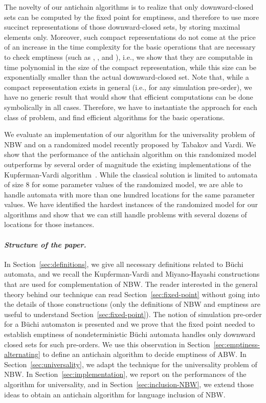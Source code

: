 \documentclass{LMCS}
\begin{document}
The novelty of our antichain algorithms is to realize that only downward-closed
sets can be computed by the fixed point for emptiness, and therefore to use more 
succinct representations of those downward-closed sets, by storing maximal elements only. 
Moreover, such compact representations do not come at the price of an increase 
in the time complexity for the basic operations that are necessary to check emptiness
(such as , , and ), i.e., we show that they are computable in time
polynomial in the size of the compact representation, while this size can be exponentially
smaller than the actual downward-closed set.
Note that, while a compact representation exists in general (i.e., for any
simulation pre-order), we have no generic result that would show that efficient
computations can be done symbolically in all cases. Therefore, we have to instantiate
the approach for each class of problem, and find efficient algorithms for
the basic operations.






We evaluate an implementation of our algorithm for the
universality problem of NBW and on a randomized model recently
proposed by Tabakov and Vardi.  We show that the performance of the
antichain algorithm on this randomized model outperforms by several order of
magnitude the existing implementations of the Kupferman-Vardi
algorithm~\cite{TabakovV07,GurumurthyKSV03}.  While the classical
solution is limited to automata of size 8 for some parameter values of
the randomized model, we are able to handle automata with more than
one hundred locations for the same parameter values. We have
identified the hardest instances of the randomized model for our
algorithms and show that we can still handle problems with several
dozens of locations for those instances.

\paragraph{{\it Structure of the paper.}}
In Section~\ref{sec:definitions}, we give all necessary definitions related to 
B\"uchi automata, and we recall the Kupferman-Vardi and
Miyano-Hayashi constructions that are used for complementation of NBW.
The reader interested in the general theory behind our technique can read 
Section~\ref{sec:fixed-point} without going into the details of those constructions
(only the definitions of NBW and emptiness are useful to understand Section~\ref{sec:fixed-point}). 
The notion of simulation pre-order for a B\"uchi automaton is presented and we prove 
that the fixed point needed to establish emptiness of nondeterministic B\"uchi automata
handles only downward closed sets for such pre-orders. 
We use this observation in Section~\ref{sec:emptiness-alternating} to define an antichain algorithm
to decide emptiness of ABW. In Section~\ref{sec:universality}, we
adapt the technique for the universality problem of NBW. In
Section~\ref{sec:implementation}, we report on the performances of the
algorithm for universality, and in Section~\ref{sec:inclusion-NBW},
we extend those ideas to obtain an antichain algorithm for language inclusion
of NBW. 
\end{document}
